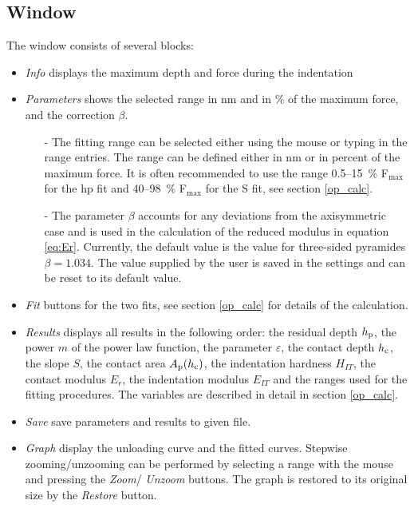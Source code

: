 \subsection{Window}
The window consists of several blocks:
\begin{itemize}
 \item \emph{Info} displays the maximum depth and force during the indentation
 \item \emph{Parameters} shows the selected range in nm and in \% of the maximum force, and the correction $\beta$. 
        \begin{itemize}
          \item[-] The fitting range can be selected either using the mouse or typing in the range entries. The range can be defined either in nm or in percent of the maximum force. 
                   It is often recommended to use the range 0.5--15~\% F$_\mathrm{max}$ for the hp fit and 40--98~\% F$_\mathrm{max}$ for the S fit, see section \ref{op_calc}.      
          \item[-] The parameter $\beta$ accounts for any deviations from the axisymmetric case and is used in the calculation of the reduced modulus in equation \eqref{eq:Er}. 
                   Currently, the default value is the value for three-sided pyramides $\beta = 1.034$. The value supplied by the user is saved in the settings and can be reset to its default value.
\end{itemize}
\item \emph{Fit} buttons for the two fits, see section \ref{op_calc} for details of the calculation.
\item \emph{Results} displays all results in the following order: the residual depth $h_\mathrm{p}$, the power $m$ of the power law function, the parameter $\varepsilon$, 
       the contact depth  $h_\mathrm{c}$, the slope $S$, the contact area $A_\mathrm{p}(h_\mathrm{c})$, the indentation hardness $H_{IT}$, the contact modulus $E_r$, the indentation modulus $E_{IT}$ and the ranges used for the fitting procedures.
       The variables are described in detail in section \ref{op_calc}.
 \item \emph{Save} save parameters and results to given file. 
 \item \emph{Graph} display the unloading curve and the fitted curves.  Stepwise zooming/unzooming can be performed by selecting a range with the mouse and pressing the \emph{Zoom}/ \emph{Unzoom} buttons. The graph is restored to its original size by the \emph{Restore} button.
\end{itemize}

